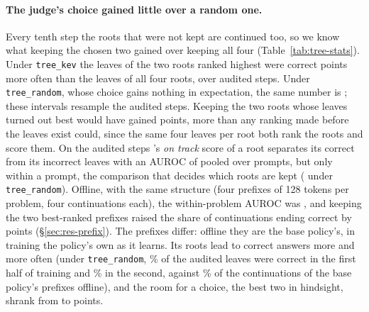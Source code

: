 \paragraph{The judge's choice gained little over a random one.} Every tenth step the roots that were not kept are
continued too, so we know what keeping the chosen two gained over keeping all four (Table~\ref{tab:tree-stats}). Under
\texttt{tree\_kev} the leaves of the two roots \kev{} ranked highest were correct 
 points more often than the leaves of all four roots,
over  audited steps. Under \texttt{tree\_random}, whose choice gains nothing in
expectation, the same number is 
; these intervals resample the audited steps.
Keeping the two roots whose leaves turned out best would have gained  points, more than any
ranking made before the leaves exist could, since the same four leaves per root both rank the roots and score them. On
the audited steps \kev{}'s \emph{on track} score of a root separates its correct from its incorrect leaves with an AUROC
of  pooled over prompts, but only 
 within a prompt, the comparison that decides which
roots are kept ( under \texttt{tree\_random}). Offline, with the same structure (four
prefixes of 128 tokens per problem, four continuations each), the within-problem AUROC was , and
keeping the two best-ranked prefixes raised the share of continuations ending correct by 
points (\S\ref{sec:res-prefix}). The prefixes differ: offline they are the base policy's, in training the policy's own
as it learns. Its roots lead to correct answers more and more often (under \texttt{tree\_random},
\% of the audited leaves were correct in the first half of training and
\% in the second, against \% of the continuations of the base
policy's prefixes offline), and the room for a choice, the best two in hindsight, shrank from 
to  points.

\begin{table}[t]
\centering\small

\caption{Inside the trees during training (mean over steps and seeds): share of roots that had already ended within 128
tokens; on the audited steps (every tenth), where all four roots of a prompt are continued, the AUROC of \kev{}'s
\emph{on track} score of a root for its leaves' verdicts, pooled and within prompt, the leaf accuracy of all four roots
(percent), and what keeping the chosen two, or the best two in hindsight, gained over it (points); tokens generated per
step (thousands, last 20 steps), not counting the audit's continuations.}
\label{tab:tree-stats}
\end{table}

